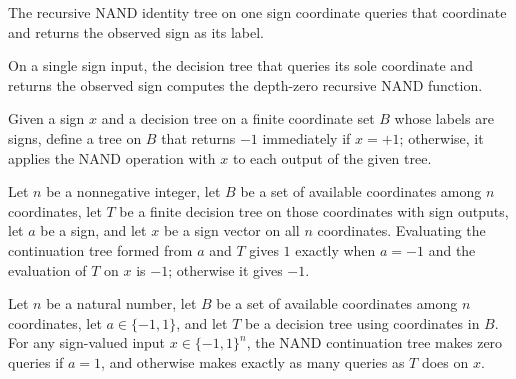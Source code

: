 \begin{definition}
\label{FABL.recursiveNandIdentityTree}
\leanok
{}
The recursive NAND identity tree on one sign coordinate queries that coordinate and
returns the observed sign as its label.
\end{definition}

\begin{theorem}
\label{FABL.recursiveNandIdentityTree_computes}
\leanok
{}
On a single sign input, the decision tree that queries its sole coordinate and returns
the observed sign computes the depth-zero recursive NAND function.
\end{theorem}

\begin{definition}
\label{FABL.nandContinuationTree}
\leanok
{}
Given a sign $x$ and a decision tree on a finite coordinate set $B$ whose labels are
signs, define a tree on $B$ that returns $-1$ immediately if $x=+1$; otherwise, it
applies the NAND operation with $x$ to each output of the given tree.
\end{definition}

\begin{theorem}
\label{FABL.eval_nandContinuationTree}
\leanok
{}
Let $n$ be a nonnegative integer, let $B$ be a set of available coordinates among $n$
coordinates, let $T$ be a finite decision tree on those coordinates with sign outputs,
let $a$ be a sign, and let $x$ be a sign vector on all $n$ coordinates. Evaluating the
continuation tree formed from $a$ and $T$ gives $1$ exactly when $a=-1$ and the
evaluation of $T$ on $x$ is $-1$; otherwise it gives $-1$.
\end{theorem}

\begin{theorem}
\label{FABL.queryCount_nandContinuationTree}
\leanok
{}
Let $n$ be a natural number, let $B$ be a set of available coordinates among $n$
coordinates, let $a\in\{−1,1\}$, and let $T$ be a decision tree using coordinates in
$B$. For any sign-valued input $x\in\{−1,1\}^{n}$, the NAND continuation tree makes zero
queries if $a=1$, and otherwise makes exactly as many queries as $T$ does on $x$.
\end{theorem}

